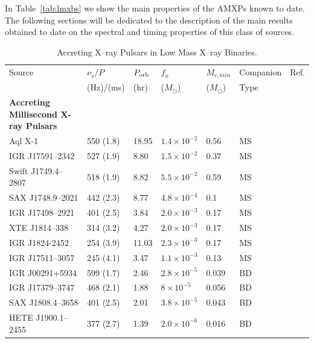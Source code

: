 \documentclass[graybox]{svmult}
\begin{document}
In Table~\ref{tab:lmxbs} we show the main properties of the AMXPs known to date. The following sections will be dedicated to the description of the main results obtained to date on the spectral and timing properties of this class of sources. 



\begin{table}
\caption{Accreting X--ray Pulsars in Low Mass X--ray Binaries.}
\scriptsize
\begin{center}
\begin{tabular}{lllllll}
\hline
\hline
Source & $\nu_{s}/P$ & $P_{\rm orb}$ & $f_{x}$  & $M_{c,min}$  & Companion  & Ref.\\
 & (Hz)/(ms) & (hr) & ($M_{\odot}$) & ($M_{\odot}$) &   Type & \\
\hline
\textbf{Accreting Millisecond X-ray Pulsars}\\
\hline
Aql X-1     & 550 (1.8) &  18.95 & $1.4\times 10^{-2}$ & 0.56 & MS & \cite{Casella2008,MataSanchez2017}\\
IGR J17591--2342 & 527 (1.9) &  8.80 & $1.5\times 10^{-2}$ & 0.37 & MS & \cite{Sanna2018c}\\
Swift J1749.4--2807 & 518 (1.9) & 8.82 & $5.5\times 10^{-2}$ & 0.59 & MS & \cite{Altamirano2011,DAvanzo2011}\\
SAX J1748.9--2021  & 442 (2.3) & 8.77 &  $4.8\times 10^{-4}$ & 0.1  & MS& \cite{Altamirano2008,Cadelano2017}\\
IGR J17498--2921 & 401 (2.5) & 3.84 & $2.0\times10^{-3}$ & 0.17 & MS & \cite{Papitto2011b}\\
XTE J1814--338  & 314  (3.2) & 4.27 & $2.0\times 10^{-3}$ & 0.17 & MS  & \cite{Markwardt2003,Wang2017}\\
IGR J1824-2452 & 254 (3.9) &  11.03 & $2.3\times 10^{-3}$ & 0.17  & MS & \cite{Papitto2013b}\\
IGR J17511--3057 & 245 (4.1) &  3.47 & $1.1\times 10^{-3}$ & 0.13  & MS & \cite{Papitto2010}\\
\hline
IGR J00291+5934    & 599  (1.7) & 2.46 & $2.8\times 10^{-5}$ & 0.039  &  BD & \cite{Galloway2005}\\
IGR J17379--3747    & 468  (2.1) & 1.88 & $8\times 10^{-5}$ & 0.056  &  BD & \cite{Sanna2018c}\\
SAX J1808.4--3658 & 401 (2.5) &  2.01 & $3.8\times 10^{-5}$ & 0.043  & BD &  \cite{Wijnands1998,Wang2013}\\
HETE J1900.1--2455& 377  (2.7) &   1.39 & $2.0\times 10^{-6}$ & 0.016  & BD  & \cite{Kaaret2006,Elebert2008}\\

\end{tabular}
\end{center}
\end{table}
\end{document}
